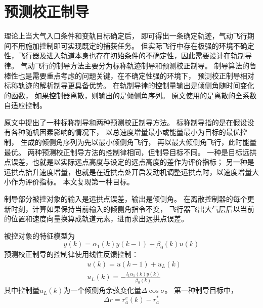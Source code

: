 \section{预测校正制导}
理论上当大气入口条件和变轨目标确定后，
即可得出一条确定轨迹，气动飞行期间不用施加控制即可实现既定的捕获任务。
但实际飞行中存在极强的环境不确定性，飞行器及进入轨道本身也存在初始条件的不确定性，因此需要设计在轨制导律。
气动飞行的制导方法主要分为标称轨迹制导和预测校正制导。
制导算法的鲁棒性也是需要重点考虑的问题关键，在不确定性强的环境下，
预测校正制导相对标称轨迹的解析制导更具备优势\cite{dqingyuan2019}。
在轨制导律的控制量输出是倾侧角随时间变化的函数，
如果控制器离散，则输出的是倾侧角序列。
原文使用的是离散的全系数自适应控制。

原文中提出了一种标称制导和两种预测校正制导方法。
标称制导指的是在假设没有各种随机因素影响的情况下，
以总速度增量最小或能量最小为目标的最优控制，
生成的倾侧角序列为先以最小倾侧角飞行，
再以最大倾侧角飞行，此时能量最优。
两种预测校正制导方法的控制律相同，但制导目标不同。
一种是目标远拱点误差，也就是以实际远点高度与设定的远点高度的差作为评价指标；
另一种是远拱点抬升速度增量，也就是在近拱点处开启发动机调整远拱点时，以速度增量大小作为评价指标。
本文复现第一种目标。

制导部分被控对象的输入是远拱点误差，输出是倾侧角。
在离散控制器的每个更新时刻，计算如果保持当前输入的倾侧角指令不变，
飞行器飞出大气层后以当前的位置和速度向量换算成轨道元素，进而求出远拱点误差。

被控对象的特征模型为
\[ y(k) = \alpha_1(k)y(k-1) + \beta_0(k)u(k) \]
预测校正制导的控制律使用线性反馈控制：
\begin{align}
    &u(k) = u(k-1) + u_L(k) \\
    &u_L(k) = -\frac{l_1\alpha_1(k)y(k)}{\beta_0(k)} \label{eqGuideCtrl}
\end{align}
其中控制量$u_L(k)$为一个倾侧角余弦变化量$\Delta\cos\sigma$。
第一种制导目标中，
\begin{equation*}
    \Delta r = r_a^e(k) - r_a^*
\end{equation*}

